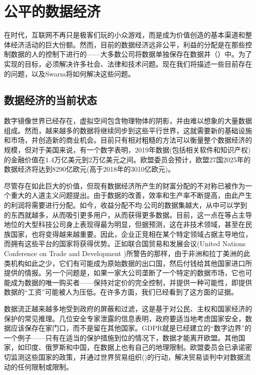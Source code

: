 \section{公平的数据经济}\label{sec:fair-data}
\green{}

在时代，互联网不再只是极客们玩的小众游戏，而是成为价值创造的基本渠道和整体经济活动的巨大份额。然而，目前的数据经济远非公平，利益的分配是在那些控制数据的人的控制下进行的——大多数公司将数据单独保存在数据井（）中。为了实现的目标，必须解决许多社会、法律和技术问题。现在我们将描述一些目前存在的问题，以及Swarm将如何解决这些问题。 

\subsection{数据经济的当前状态\statusgreen} \label{sec:dataeconomy}

数字镜像世界已经存在，虚拟空间包含物理物体的阴影，并由难以想象的大量数据\cite{MirrorWorlds2020Feb}组成。然而，越来越多的数据将继续同步到这些平行世界，这就需要新的基础设施和市场，并创造新的商业机会。目前只有相对粗糙的方法可以衡量整个数据经济的规模，但对于美国来说，有一个数字表明，2019年数据(包括相关软件和知识产权)的金融价值在1.4万亿美元到2万亿美元之间。欧盟委员会预计，欧盟27国2025年的数据经济将达到8290亿欧元(高于2018年的3010亿欧元)。

尽管存在如此巨大的价值，但现有数据经济所产生的财富分配的不对称已被作为一个重大的人道主义问题提出。由于数据的改善，效率和生产率不断提高，由此产生的利润将需要进行分配。如今，收益分配不均:公司的数据集越大，从中可以学到的东西就越多，从而吸引更多用户，从而获得更多数据。目前，这一点在等占主导地位的大型科技公司身上表现得最为明显，但据预测，这在非技术领域，甚至在民族国家，也将变得越来越重要。因此，企业正竞相在某个特定领域占据主导地位，而拥有这些平台的国家将获得优势。正如联合国贸易和发展会议(United Nations Conference on Trade and Development \cite{TheWinner2020Feb})所警告的那样，由于非洲和拉丁美洲的此类机构如此之少，它们有可能成为原始数据的出口国，然后付钱给其他国家进口所提供的情报。另一个问题是，如果一家大公司垄断了一个特定的数据市场，它也可能成为数据的唯一购买者——保持对定价的完全控制，并提供一种可能性，即提供数据的“工资”可能被人为压低。在许多方面，我们已经看到了这方面的证据。 


数据流正越来越多地受到政府的屏蔽和过滤，这是基于对公民、主权和国家经济的保护的常见推理。几位安全专家泄露的信息表明，政府要适当地考虑国家安全，数据应该保存在家门口，而不是留在其他国家。GDPR就是已经建立的“数字边界”的一个例子——只有在适当的保护措施到位的情况下，数据才能离开欧盟。其他国家，如印度、俄罗斯和中国，在数据上也有自己的地理限制。欧盟委员会已承诺密切监测这些国家的政策，并通过世界贸易组织(\cite{EUWhitePaperAI2020Feb})的行动，解决贸易谈判中对数据流动的任何限制或限制。

